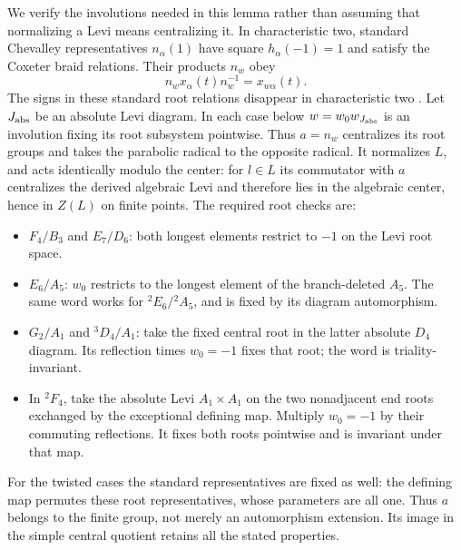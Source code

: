 \documentclass[11pt]{article}
\theoremstyle{definition}
\begin{document}
We verify the involutions needed in this lemma rather than assuming that normalizing a Levi means centralizing it. In characteristic two, standard Chevalley representatives $n_\alpha(1)$ have square $h_\alpha(-1)=1$ and satisfy the Coxeter braid relations. Their products $n_w$ obey
\[
n_wx_\alpha(t)n_w^{-1}=x_{w\alpha}(t).
\]
The signs in these standard root relations disappear in characteristic two \cite[Chapters 6--8]{CarterSimple}. Let $J_{\rm abs}$ be an absolute Levi diagram. In each case below $w=w_0w_{J_{\rm abs}}$ is an involution fixing its root subsystem pointwise. Thus $a=n_w$ centralizes its root groups and takes the parabolic radical to the opposite radical. It normalizes $L$, and acts identically modulo the center: for $l\in L$ its commutator with $a$ centralizes the derived algebraic Levi and therefore lies in the algebraic center, hence in $Z(L)$ on finite points. The required root checks are:
\begin{itemize}
\item $F_4/B_3$ and $E_7/D_6$: both longest elements restrict to $-1$ on the Levi root space.
\item $E_6/A_5$: $w_0$ restricts to the longest element of the branch-deleted $A_5$. The same word works for $^2E_6/{}^2A_5$, and is fixed by its diagram automorphism.
\item $G_2/A_1$ and $^3D_4/A_1$: take the fixed central root in the latter absolute $D_4$ diagram. Its reflection times $w_0=-1$ fixes that root; the word is triality-invariant.
\item In $^2F_4$, take the absolute Levi $A_1\times A_1$ on the two nonadjacent end roots exchanged by the exceptional defining map. Multiply $w_0=-1$ by their commuting reflections. It fixes both roots pointwise and is invariant under that map.
\end{itemize}
For the twisted cases the standard representatives are fixed as well: the defining map permutes these root representatives, whose parameters are all one. Thus $a$ belongs to the finite group, not merely an automorphism extension. Its image in the simple central quotient retains all the stated properties.
\end{document}
